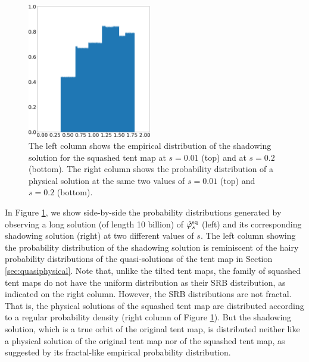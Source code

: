 \begin{figure}
    \includegraphics[width=0.48\textwidth]{figure/tent_squashed_physical_density_0.2.png}
    \caption{The left column shows the empirical distribution of the shadowing solution for the squashed tent map at $s=0.01$ (top) and at $s=0.2$ (bottom). The right column shows the probability distribution of a physical solution at the same two values of $s = 0.01$ (top) and $s = 0.2$ (bottom).}
    \label{fig:tent_squashed_shadow}
\end{figure}
In Figure \ref{fig:tent_squashed_shadow}, we show side-by-side the probability distributions generated by observing a long solution (of length 10 billion) 
of $\hat{\varphi}^{\rm sq}_s$ (left) and its corresponding shadowing solution (right)
at two different values of $s.$ The left column showing the probability distribution of the shadowing solution is reminiscent of the hairy probability distributions of 
the quasi-solutions of the tent map in Section \ref{sec:quasiphysical}. Note that, unlike the tilted tent maps, the family of squashed tent maps do not have the uniform distribution as their SRB distribution, as indicated on the right column. However, the SRB distributions are not fractal. That is, the physical solutions of the squashed tent map are distributed according to a regular probability density (right column of Figure \ref{fig:tent_squashed_shadow}). But the shadowing solution, which is a true orbit of the original tent map, is distributed neither like a physical solution of the original tent map nor of the squashed tent map, as suggested by its fractal-like empirical probability distribution. 

